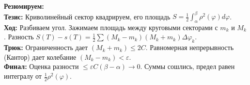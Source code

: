 \begin{tcolorbox}[colback=gray!5, colframe=black, boxrule=0.5pt, arc=0pt]
\textbf{Резюмируем:} \\
\textbf{Тезис:} Криволинейный сектор квадрируем, его площадь $S = \frac{1}{2} \int_{\alpha}^{\beta} \rho^2(\varphi) d\varphi$. \\
\textbf{Ход:} Разбиваем угол. Зажимаем площадь между круговыми секторами с $m_k$ и $M_k$. Разность $S(T) - s(T) = \frac{1}{2} \sum (M_k - m_k)(M_k + m_k) \Delta \varphi_k$. \\
\textbf{Трюк:} Ограниченность дает $(M_k + m_k) \le 2C$. Равномерная непрерывность (Кантор) дает колебание $(M_k - m_k) < \varepsilon$. \\
\textbf{Финал:} Оценка разности $\le \varepsilon C (\beta - \alpha) \to 0$. Суммы сошлись, предел равен интегралу от $\frac{1}{2}\rho^2(\varphi)$.
\end{tcolorbox}
